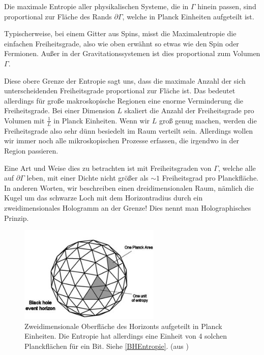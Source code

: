 \documentclass[ngerman]{scrartcl}
\begin{document}
Die maximale Entropie aller physikalischen Systeme, die in $\Gamma$ hinein passen, sind proportional zur Fläche des Rands $\partial \Gamma$, welche in Planck Einheiten aufgeteilt ist. 

Typischerweise, bei einem Gitter aus Spins, misst die Maximalentropie die einfachen Freiheitsgrade, also wie oben erwähnt so etwas wie den Spin oder Fermionen. Außer in der Gravitationssystemen ist dies proportional zum Volumen $\Gamma$. 

Diese obere Grenze der Entropie sagt uns, dass die maximale Anzahl der sich unterscheidenden Freiheitsgrade proportional zur Fläche ist. Das bedeutet allerdings für große makroskopische Regionen eine enorme Verminderung die Freiheitsgrade. Bei einer Dimension $L$ skaliert die Anzahl der Freiheitsgrade pro Volumen mit $\frac{1}{L}$ in Planck Einheiten.
Wenn wir $L$ groß genug machen, werden die Freiheitsgrade also sehr dünn besiedelt im Raum verteilt sein. Allerdings wollen wir immer noch alle mikroskopischen Prozesse erfassen, die irgendwo in der Region passieren. 

Eine Art und Weise dies zu betrachten ist mit Freiheitsgraden von $\Gamma$, welche alle auf $\partial \Gamma$ leben, mit einer Dichte nicht größer als $\sim 1$ Freiheitsgrad pro Planckfläche. In anderen Worten, wir beschreiben einen dreidimensionalen Raum, nämlich die Kugel um das schwarze Loch mit dem Horizontradius durch ein zweidimensionales Hologramm an der Grenze! Dies nennt man Holographisches Prinzip. 

	\begin{figure} 
		\begin{center}
			\includegraphics[width=0.6\textwidth]{BHentropy1}
		\end{center}
		\caption{Zweidimensionale Oberfläche des Horizonts aufgeteilt in Planck Einheiten. Die Entropie hat allerdings eine Einheit von 4 solchen Planckflächen für ein Bit. Siehe \ref{BHEntropie}. (aus \cite{BekensteinHawking})}
	\end{figure} 
\end{document}
